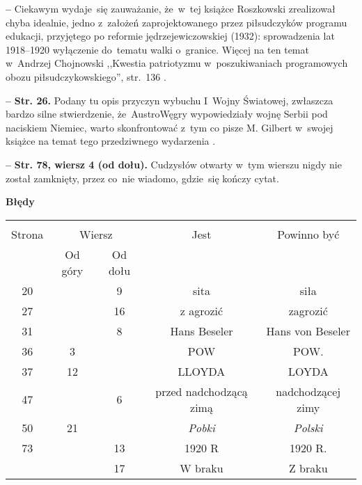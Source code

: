 \documentclass[a4paper,11pt]{article}
\newcommand{\spaceFour}{0.5em}
\newcommand{\tb}{\textbf}
\newcommand{\noi}{\noindent}
\newcommand{\start}{\noi \tb{--} {}}
\newcommand{\Center}[1]{\begin{center} #1 \end{center}}
\newcommand{\CenterTB}[1]{\Center{\tb{#1}}}
\newcommand{\Str}[1]{\tb{Str. #1.}}
\newcommand{\StrWd}[2]{\tb{Str. #1, wiersz #2 (od dołu).}}
\begin{document}
\vspace{\spaceFour}


\start Ciekawym wydaje~się zauważanie, że~w~tej książce Roszkowski
zrealizował chyba idealnie, jedno z~założeń zaprojektowanego przez
piłsudczyków programu edukacji, przyjętego po reformie
jędrzejewiczowskiej (1932): sprowadzenia lat 1918--1920 wyłączenie
do~tematu walki o~granice. Więcej na ten temat \\
w~Andrzej Chojnowski ,,Kwestia patriotyzmu w~poszukiwaniach
programowych obozu piłsudczykowskiego'', str.~136
\cite{PatriotyzmPolakow06}.

\vspace{\spaceFour}


\start \Str{26} Podany tu opis przyczyn wybuchu I~Wojny Światowej,
zwłaszcza bardzo silne stwierdzenie, że~Austro\dywiz Węgry
wypowiedziały wojnę Serbii pod naciskiem Niemiec, warto skonfrontować
z~tym co pisze M. Gilbert w~swojej książce na temat tego przedziwnego
wydarzenia \cite{Gilbert03}.

\vspace{\spaceFour}


\start \StrWd{78}{4} Cudzysłów otwarty w~tym wierszu nigdy nie został
zamknięty, przez co~nie wiadomo, gdzie~się kończy cytat.

\CenterTB{Błędy}
\begin{center}
  \begin{tabular}{|c|c|c|c|c|}
    \hline
    & \multicolumn{2}{c|}{} & & \\
    Strona & \multicolumn{2}{c|}{Wiersz}& Jest & Powinno być \\ \cline{2-3}
    & Od góry & Od dołu &  &  \\ \hline
    20 & & 9 & sita & siła \\
    27 & & 16 & z agrozić & zagrozić \\
    31 & & 8 & Hans Beseler & Hans von Beseler \\
    36 & 3 & & POW & POW. \\
    37 & 12 & & LLOYDA & LOYDA \\
    47 & & 6 & przed nadchodzącą zimą & nadchodzącej zimy \\
    50 & 21 & & \emph{Pobki} & \emph{Polski} \\
    73 & & 13 & 1920 R & 1920 R. \\
    & & 17 & W braku & Z braku \\
    \hline
  \end{tabular}
\end{center}
\end{document}
